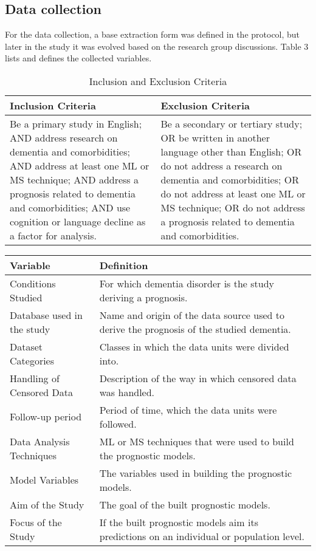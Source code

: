 \documentclass[12pt]{article}
\begin{document}
\subsection{Data collection}
For the data collection, a base extraction form was defined in the protocol, but later in the study it was evolved based on the research group discussions. Table 3 lists and defines the collected variables.

\begin{table}
	\begin{tabular}{ p{6cm} | p{6cm} }
	\hline
	Inclusion Criteria & Exclusion Criteria \\ \hline
	Be a primary study in English; AND address research on dementia and comorbidities; AND address at least one ML or MS technique; AND address a prognosis related to dementia and comorbidities; AND use cognition or language decline as a factor for analysis. &
	Be a secondary or tertiary study; OR be written in another language other than English; OR do not address a research on dementia and comorbidities; OR do not address at least one ML or MS technique; OR do not address a prognosis related to dementia and comorbidities. \\
	\hline 
	\end{tabular}
	\caption[Table caption text]{Inclusion and Exclusion Criteria}
	\label{table:name}
\end{table}

\begin{table}
	\begin{tabular}{ p{6cm} | p{6cm} }
	\hline
	Variable & Definition \\ \hline
	Conditions Studied & For which dementia disorder is the study deriving a prognosis. \\ \hline
	Database used in the study & Name and origin of the data source used to derive the prognosis of the studied dementia. \\ \hline
	Dataset Categories & Classes in which the data units were divided into. \\ \hline
	Handling of Censored Data & Description of the way in which censored data was handled. \\ \hline
	Follow-up period & Period of time, which the data units were followed. \\ \hline
	Data Analysis Techniques & ML or MS techniques that were used to build the prognostic models. \\ \hline 
	Model Variables & The variables used in building the prognostic models. \\ \hline
	Aim of the Study & The goal of the built prognostic models. \\ \hline 
	Focus of the Study & If the built prognostic models aim its predictions on an individual or population level. \\
	\hline 
	\end{tabular}
	
\end{table}
\end{document}
